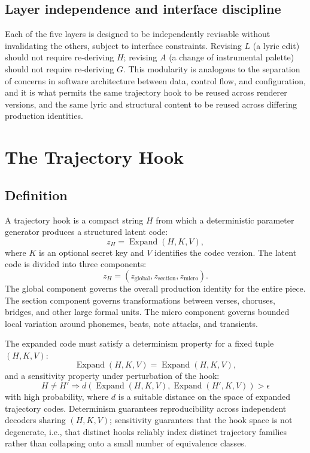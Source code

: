 \documentclass[11pt]{article}
\DeclareMathOperator{\Expand}{Expand}
\begin{document}
\subsection{Layer independence and interface discipline}

Each of the five layers is designed to be independently revisable without invalidating the others, subject to interface constraints. Revising $L$ (a lyric edit) should not require re-deriving $H$; revising $A$ (a change of instrumental palette) should not require re-deriving $G$. This modularity is analogous to the separation of concerns in software architecture between data, control flow, and configuration, and it is what permits the same trajectory hook to be reused across renderer versions, and the same lyric and structural content to be reused across differing production identities.

\section{The Trajectory Hook}

\subsection{Definition}

A trajectory hook is a compact string $H$ from which a deterministic parameter generator produces a structured latent code:
\[
z_H=\Expand(H,K,V),
\]
where $K$ is an optional secret key and $V$ identifies the codec version. The latent code is divided into three components:
\[
z_H=(z_{\mathrm{global}},z_{\mathrm{section}},z_{\mathrm{micro}}).
\]
The global component governs the overall production identity for the entire piece. The section component governs transformations between verses, choruses, bridges, and other large formal units. The micro component governs bounded local variation around phonemes, beats, note attacks, and transients.

The expanded code must satisfy a determinism property for a fixed tuple $(H,K,V)$:
\[
\Expand(H,K,V)
=
\Expand(H,K,V),
\]
and a sensitivity property under perturbation of the hook:
\[
H\neq H'
\Longrightarrow
d\!\left(
\Expand(H,K,V),
\Expand(H',K,V)
\right)>\epsilon
\]
with high probability, where $d$ is a suitable distance on the space of expanded trajectory codes. Determinism guarantees reproducibility across independent decoders sharing $(H,K,V)$; sensitivity guarantees that the hook space is not degenerate, i.e., that distinct hooks reliably index distinct trajectory families rather than collapsing onto a small number of equivalence classes.
\end{document}
